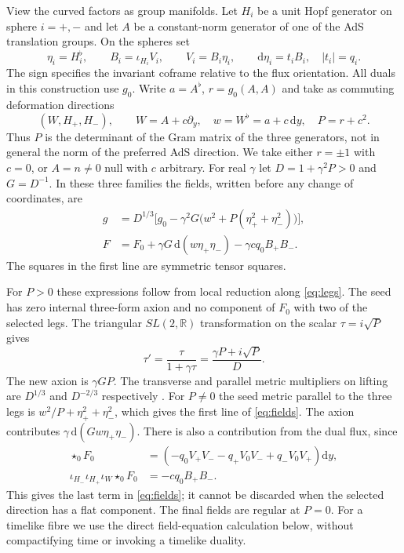 \documentclass[11pt,a4paper]{article}
\numberwithin{equation}{section}
\newcommand{\dd}{\mathrm{d}}
\begin{document}
View the curved factors as group manifolds. Let $H_i$ be a unit Hopf generator on sphere $i=+,-$ and let $A$ be a constant-norm generator of one of the AdS translation groups. On the spheres set
\begin{equation}
 \eta_i=H_i^\flat,\qquad B_i=\iota_{H_i}V_i,\qquad V_i=B_i\eta_i,\qquad \dd\eta_i=t_i B_i,\quad |t_i|=q_i .\label{eq:hopf}
\end{equation}
The sign specifies the invariant coframe relative to the flux orientation. All duals in this construction use $g_0$. Write $a=A^\flat$, $r=g_0(A,A)$ and take as commuting deformation directions
\begin{equation}
 (W,H_+,H_-),\qquad W=A+c\partial_y,\quad w=W^\flat=a+c\,\dd y,\quad P=r+c^2 .\label{eq:legs}
\end{equation}
Thus $P$ is the determinant of the Gram matrix of the three generators, not in general the norm of the preferred AdS direction. We take either $r=\pm1$ with $c=0$, or $A=n\ne0$ null with $c$ arbitrary. For real $\gamma$ let $D=1+\gamma^2P>0$ and $G=D^{-1}$. In these three families the fields, written before any change of coordinates, are
\begin{equation}
 \boxed{\begin{aligned}
 g&=D^{1/3}\bigl[g_0-\gamma^2G\bigl(w^2+P(\eta_+^2+\eta_-^2)\bigr)\bigr],\\
 F&=F_0+\gamma G\,\dd(w\eta_+\eta_-)-\gamma c q_0 B_+ B_- .
 \end{aligned}}\label{eq:fields}
\end{equation}
The squares in the first line are symmetric tensor squares.

For $P>0$ these expressions follow from local reduction along \eqref{eq:legs}. The seed has zero internal three-form axion and no component of $F_0$ with two of the selected legs. The triangular $SL(2,\mathbb R)$ transformation on the scalar $\tau=i\sqrt P$ gives
\begin{equation*}
 \tau'=\frac{\tau}{1+\gamma\tau}=\frac{\gamma P+i\sqrt P}{D} .
\end{equation*}
The new axion is $\gamma GP$. The transverse and parallel metric multipliers on lifting are $D^{1/3}$ and $D^{-2/3}$ respectively \cite{LM,GLMW}. For $P\ne0$ the seed metric parallel to the three legs is $w^2/P+\eta_+^2+\eta_-^2$, which gives the first line of \eqref{eq:fields}. The axion contributes $\gamma\,\dd(Gw\eta_+\eta_-)$. There is also a contribution from the dual flux, since
\begin{align}
 \star_0 F_0&=(-q_0V_+V_- -q_+V_0V_-+q_-V_0V_+)\dd y,\nonumber\\
 \iota_{H_-}\iota_{H_+}\iota_W\star_0F_0&=-c q_0 B_+B_- .\label{eq:magnetic}
\end{align}
This gives the last term in \eqref{eq:fields}; it cannot be discarded when the selected direction has a flat component. The final fields are regular at $P=0$. For a timelike fibre we use the direct field-equation calculation below, without compactifying time or invoking a timelike duality.
\end{document}

